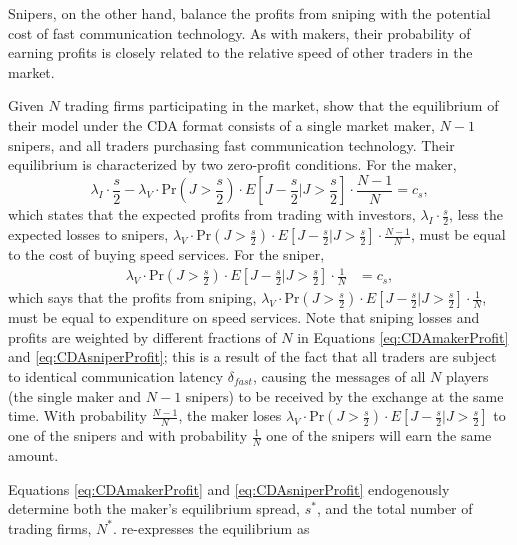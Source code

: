 \documentclass[12pt]{article}
\begin{document}
Snipers, on the other hand, balance the profits from sniping with the potential cost of fast communication technology. As with makers, their probability of earning profits is closely related to the relative speed of other traders in the market.

Given $N$ trading firms participating in the market, \cite{Budish2015} show that the equilibrium of their model under the CDA format consists of a single market maker, $N-1$ snipers, and all traders purchasing fast communication technology. Their equilibrium is characterized by two zero-profit conditions. For the maker,
\begin{equation}
  \lambda_{I} \cdot \frac{s}{2} - 
  \lambda_V    \cdot    \textrm{Pr}\left(J > \frac{s}{2}\right)    \cdot    E \left[J-\frac{s}{2} | J>\frac{s}{2}\right] 
  \cdot    \frac{N-1}{N}   =   c_s, \label{eq:CDAmakerProfit}
\end{equation}
which states that the expected profits from trading with investors, $\lambda_{I} \cdot \frac{s}{2}$, less the expected losses to snipers, $\lambda_V \cdot \textrm{Pr}\left(J > \frac{s}{2}\right) \cdot E\left[J-\frac{s}{2}|J>\frac{s}{2}\right] \cdot \frac{N-1}{N}$, must be equal to the cost of buying speed services. For the sniper,
\begin{align}
\lambda_V \cdot \textrm{Pr}\left(J > \frac{s}{2}\right) \cdot E\left[J-\frac{s}{2}|J>\frac{s}{2}\right] \cdot \frac{1}{N} & = c_s, \label{eq:CDAsniperProfit}
\end{align}
which says that the profits from sniping, $\lambda_V \cdot \textrm{Pr}\left(J > \frac{s}{2}\right) \cdot E\left[J-\frac{s}{2}|J>\frac{s}{2}\right] \cdot \frac{1}{N}$, must be equal to expenditure on speed services. Note that sniping losses and profits are weighted by different fractions of $N$ in Equations \eqref{eq:CDAmakerProfit} and \eqref{eq:CDAsniperProfit}; this is a result of the fact that all traders are subject to identical communication latency $\delta_{fast}$, causing the messages of all $N$ players (the single maker and $N-1$ snipers) to be received by the exchange at the same time. With probability $\frac{N-1}{N}$, the maker loses $\lambda_V \cdot \textrm{Pr}\left(J > \frac{s}{2}\right) \cdot E\left[J-\frac{s}{2}|J>\frac{s}{2}\right]$ to one of the snipers and with probability $\frac{1}{N}$ one of the snipers will earn the same amount.

Equations \eqref{eq:CDAmakerProfit} and \eqref{eq:CDAsniperProfit} endogenously determine both the maker's equilibrium spread, $s^*$, and the total number of trading firms, $N^*$. \cite{Budish2015} re-expresses the equilibrium as
\end{document}
